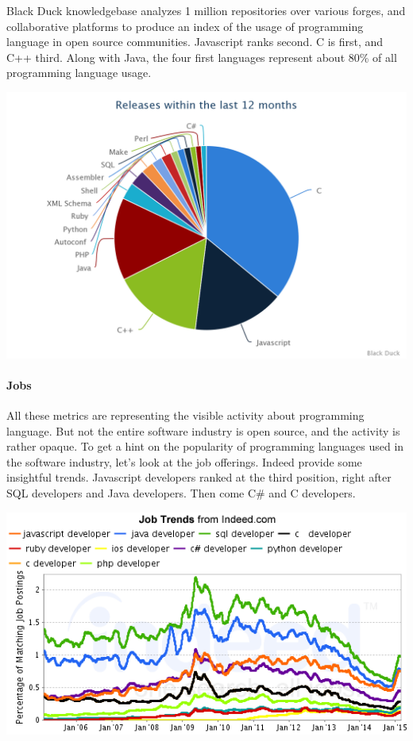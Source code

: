 Black Duck knowledgebase analyzes 1 million repositories over various forges, and collaborative platforms to produce an index of the usage of programming language in open source communities.
Javascript ranks second.
C is first, and C++ third.
Along with Java, the four first languages represent about 80\% of all programming language usage.

\includegraphics[width=0.9\linewidth]{../../data/js-trends/black-duck-15}

\paragraph{Jobs}

All these metrics are representing the visible activity about programming language.
But not the entire software industry is open source, and the activity is rather opaque.
To get a hint on the popularity of programming languages used in the software industry, let's look at the job offerings.
Indeed provide some insightful trends.
Javascript developers ranked at the third position, right after SQL developers and Java developers.
Then come C\# and C developers.

\includegraphics[width=0.9\linewidth]{../../data/js-trends/jobgraph}

